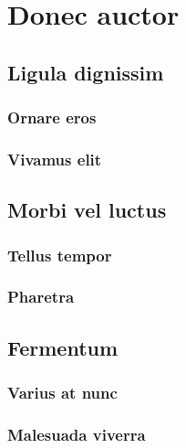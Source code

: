 \chapter{Donec auctor}

	\section{Ligula dignissim}

		\subsection{Ornare eros}

			\lipsum[18-20]

		\subsection{Vivamus elit}

			\lipsum[21-22]

	\section{Morbi vel luctus}

		\subsection{Tellus tempor}

			\lipsum[23-24]

		\subsection{Pharetra}

			\lipsum[25-26]

	\section{Fermentum}

		\subsection{Varius at nunc}

			\lipsum[27-29]

		\subsection{Malesuada viverra}

			\lipsum[30-32]
